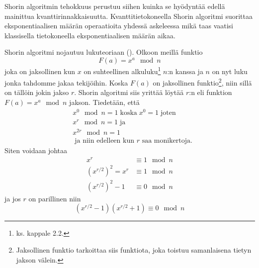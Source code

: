 Shorin algoritmin tehokkuus perustuu siihen kuinka se hyödyntää edellä mainittua kvanttirinnakkaisuutta. Kvanttitietokoneella Shorin algoritmi suorittaa eksponentiaalisen määrän operaatioita yhdessä askeleessa mikä taas vaatisi klassisella tietokoneella eksponentiaalisen määrän aikaa.

\iffalse
Shorin algoritmi nojautuu lukuteoriaan (\cite{hayward2008quantum}). Olkoon meillä funktio \[F(a) = x^{a} \mod n\]
joka on jaksollinen\footnote{Jaksollinen funktio tarkoittaa funktiota, joka toistuu samanlaisena tietyn jakson välein.} kun $x$ on suhteellinen alkuluku\footnote{ks. kappale 2.2.} $n$:n kanssa ja $n$ on nyt luku jonka haluamme jakaa tekijöihin. Koska $F(a)$ on jaksollinen niin sillä on tällöin jokin jakso $r$. 
\fi

Shorin algoritmi nojautuu lukuteoriaan (\cite{hayward2008quantum}). %
Olkoon meillä funktio
\begin{equation}
    \label{eq1}
    F(a) = x^{a} \mod n
\end{equation}
joka on jaksollinen kun $x$ on suhteellinen alkuluku\footnote{ks. kappale 2.2.} $n$:n kanssa ja $n$ on nyt luku jonka tahdomme jakaa tekijöihin. Koska $F(a)$ on jaksollinen funktio\footnote{Jaksollinen funktio tarkoittaa siis funktiota, joka toistuu samanlaisena tietyn jakson välein.}, niin sillä on tällöin jokin jakso $r$. Shorin algoritmi siis yrittää löytää $r$:n eli funktion $F(a) = x^{a} \mod n$ jakson. Tiedetään, että 
\begin{equation}
    \label{eq2}
    \begin{split}
    & x^{0} \mod n = 1 \; \text{koska} \;  x^0 = 1 \; \text{joten} \\
    & x^{r} \mod n = 1 \; \text{ja} \\
    & x^{2r} \mod n = 1 \\
    & \; \text{ja niin edelleen kun $r$ saa monikertoja.}
    \end{split}
\end{equation}
Siten voidaan johtaa
\begin{equation}
    \label{eq3}
    \begin{split}
    x^{r} & \equiv 1 \mod n \\
    (x^{r/2})^{2} = x^{r} & \equiv 1 \mod n \\
    (x^{r/2})^{2} - 1 & \equiv 0 \mod n
    \end{split}
\end{equation}
ja jos $r$ on parillinen niin
\begin{equation}
    \label{eq4}
    (x^{r/2} - 1)(x^{r/2} + 1) \equiv 0 \mod n
\end{equation}

